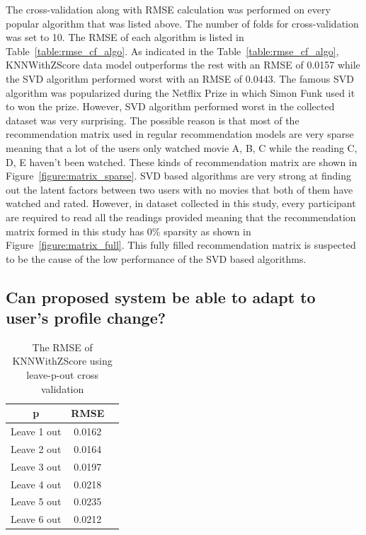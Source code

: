The cross-validation along with RMSE calculation was performed on every popular algorithm that was listed above. The number of folds for cross-validation was set to 10. The RMSE of each algorithm is listed in Table~\ref{table:rmse_cf_algo}. As indicated in the Table~\ref{table:rmse_cf_algo}, KNNWithZScore data model outperforms the rest with an RMSE of 0.0157 while the SVD algorithm performed worst with an RMSE of 0.0443. The famous SVD \cite{Salakhutdinov2007} algorithm was popularized during the Netflix Prize in which Simon Funk used it to won the prize. However, SVD algorithm performed worst in the collected dataset was very surprising. The possible reason is that most of the recommendation matrix used in regular recommendation models are very sparse meaning that a lot of the users only watched movie A, B, C while the reading C, D, E haven't been watched. These kinds of recommendation matrix are shown in Figure~\ref{figure:matrix_sparse}. SVD based algorithms are very strong at finding out the latent factors between two users with no movies that both of them have watched and rated. However, in dataset collected in this study, every participant are required to read all the readings provided meaning that the recommendation matrix formed in this study has 0\% sparsity as shown in Figure~\ref{figure:matrix_full}. This fully filled recommendation matrix is suspected to be the cause of the low performance of the SVD based algorithms. 

\subsection{Can proposed system be able to adapt to user's profile change?}

\begin{table}[btp]
 \caption{\label{table:rmse_cf_algo_leave_p_out} The RMSE of KNNWithZScore using leave-p-out cross validation}
 \begin{center}
  \begin{tabular}{ccc}
   \hline
   p & RMSE  \\
   \hline
   Leave 1 out & 0.0162 \\
   Leave 2 out & 0.0164 \\
   Leave 3 out & 0.0197 \\
   Leave 4 out & 0.0218 \\
   Leave 5 out & 0.0235 \\
   Leave 6 out & 0.0212 \\
   \hline
  \end{tabular} 
 \end{center}
\end{table}

